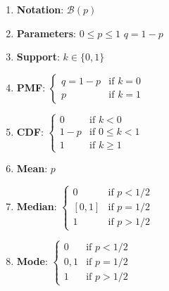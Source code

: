 \begin{enumerate}
    \item \textbf{Notation}:
    $
        \mathcal{B}(p)
    $
    \hfill \cite{wiki/Bernoulli_distribution}

    \item \textbf{Parameters}:
    $  {\displaystyle 0\leq p\leq 1}$
    \hspace{1cm}
    $ {\displaystyle q=1-p} $
    \hfill \cite{wiki/Bernoulli_distribution}

    \item \textbf{Support}:
    $
         {\displaystyle k\in \{0,1\}}
    $
    \hfill \cite{wiki/Bernoulli_distribution}

    \item \textbf{PMF}:
    $
         {\displaystyle {\begin{cases}q=1-p&{\text{if }}k=0\\p&{\text{if }}k=1\end{cases}}}
    $
    \hfill \cite{wiki/Bernoulli_distribution}

    \item \textbf{CDF}:
    $
         {\displaystyle {\begin{cases}0&{\text{if }}k<0\\1-p&{\text{if }}0\leq k<1\\1&{\text{if }}k\geq 1\end{cases}}}
    $
    \hfill \cite{wiki/Bernoulli_distribution}

    \item \textbf{Mean}:
    $
        p
    $
    \hfill \cite{wiki/Bernoulli_distribution}

    \item \textbf{Median}:
    $
         {\displaystyle {\begin{cases}0&{\text{if }}p<1/2\\\left[0,1\right]&{\text{if }}p=1/2\\1&{\text{if }}p>1/2\end{cases}}}
    $
    \hfill \cite{wiki/Bernoulli_distribution}

    \item \textbf{Mode}:
    $
         {\displaystyle {\begin{cases}0&{\text{if }}p<1/2\\0,1&{\text{if }}p=1/2\\1&{\text{if }}p>1/2\end{cases}}}
    $
    \hfill \cite{wiki/Bernoulli_distribution}


\end{enumerate}

